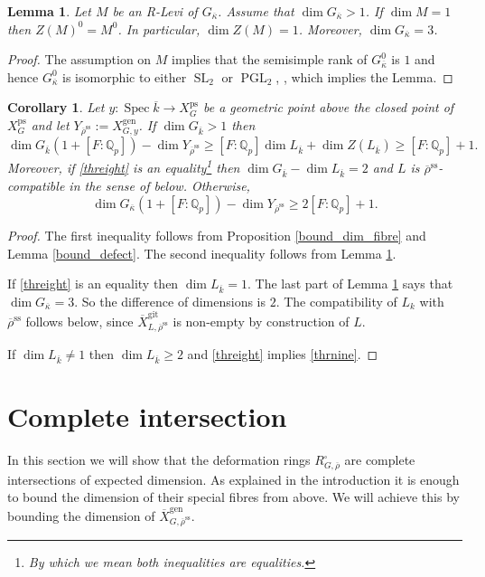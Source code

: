 \documentclass{amsart}
\newtheorem{lem}[prop]{Lemma}
\newtheorem{cor}[prop]{Corollary}
\theoremstyle{definition}
\theoremstyle{remark}
\DeclareMathOperator{\SL}{SL}
\DeclareMathOperator{\Spec}{Spec}
\newcommand{\Qp}{\mathbb {Q}_p}
\newcommand{\rhobar}{\overline{\rho}}
\newcommand{\ps}{\mathrm{ps}}
\newcommand{\gen}{\mathrm{gen}}
\newcommand{\gps}{\mathrm{git}}
\DeclareMathOperator{\PGL}{PGL}
\newcommand{\Xbar}{\overline{X}}
\newcommand{\kappabar}{\overline{\kappa}}
\newcommand{\kbar}{\overline{k}}
\newcommand{\rhobarss}{\rhobar^{\mathrm{ss}}}
\begin{document}
\begin{lem}\label{tiny_levi} Let $M$ be an R-Levi of $G_{\kappabar}$. Assume that $\dim G_{\kappabar}>1$. If $\dim M=1$ then $Z(M)^0= M^0$. In particular, 
$\dim Z(M)=1$. Moreover, $\dim G_{\kappabar}=3$.
\end{lem}
\begin{proof} The assumption on $M$ implies that 
the semisimple rank of $G^0_{\kappabar}$ is $1$ and
hence $G^0_{\kappabar}$ is isomorphic to either $\SL_2$ or $\PGL_2$, \cite[Theorem 20.33]{milne_alg}, which implies the Lemma. 
\end{proof}

\begin{cor}\label{bound_Y}  Let $y:\Spec \kbar\rightarrow X^{\ps}_{G} $ be a geometric point above the closed point of $X^{\ps}_{G}$ and let $Y_{\rhobarss}:= X^{\gen}_{G,y}$. If $\dim G_{\kbar}>1$ then 
\begin{equation}\label{threight}
\dim G_{\kbar}(1+[F:\Qp]) - \dim Y_{\rhobarss} \ge [F:\Qp] \dim L_{\kbar} + 
\dim Z(L_{\kbar}) \ge [F:\Qp]+1.
\end{equation}
Moreover, if \eqref{threight} is an equality\footnote{ By which we mean both inequalities are equalities.} then $\dim G_{\kbar}-\dim L_{\kbar}=2$ and $L$ is $\rhobarss$-compatible in the sense of 
 below. Otherwise, 
\begin{equation}\label{thrnine}
\dim G_{\kappabar}(1+[F:\Qp])- \dim Y_{\rhobarss}\ge 2[F:\Qp]+1.
\end{equation}
\end{cor}
\begin{proof} The first inequality follows from Proposition \ref{bound_dim_fibre} and Lemma \ref{bound_defect}.
The second inequality follows from Lemma \ref{tiny_levi}.  

If \eqref{threight} is an equality then  
$\dim L_{\kbar}=1$. The last part of Lemma \ref{tiny_levi} says that $\dim G_{\kappabar}=3$.
So the difference of dimensions is $2$. The compatibility of $L_k$ with $\rhobarss$ follows  below, since $\Xbar^{\gps}_{L, \rhobarss}$ is non-empty by construction of $L$.

If $\dim L_{\kbar}\neq 1$ then $\dim L_{\kbar}\ge 2$ and \eqref{threight} implies \eqref{thrnine}.
\end{proof}


\section{Complete intersection} \label{sec_complete_intersection}
In this section we will show that the deformation rings $R^{\square}_{G, \rhobar}$ are 
complete intersections of expected dimension. As explained in the introduction it is 
enough to bound the dimension of their special fibres from above. We will achieve this 
by bounding the dimension of $\Xbar^{\gen}_{G, \rhobarss}$. 
\end{document}
